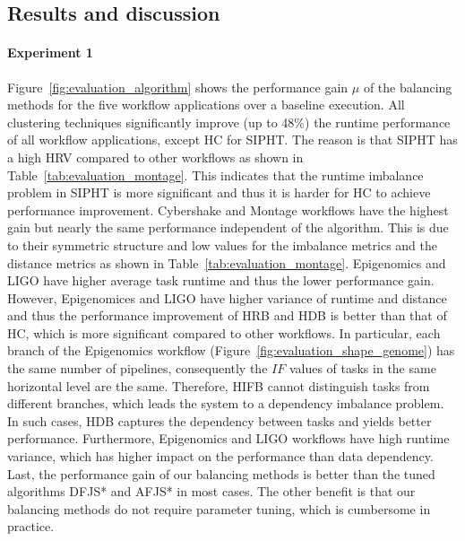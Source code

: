 

\subsection{Results and discussion}
\label{sec:results}
\paragraph{\textbf{Experiment 1}}
Figure~\ref{fig:evaluation_algorithm} shows the performance gain $\mu$ of the balancing methods for the five workflow applications over a baseline execution. All clustering techniques significantly improve (up to 48\%) the runtime performance of all workflow applications, except HC for SIPHT. The reason is that SIPHT has a high HRV compared to other workflows as shown in Table~\ref{tab:evaluation_montage}. This indicates that the runtime imbalance problem in SIPHT is more significant and thus it is harder for HC to achieve performance improvement. Cybershake and Montage workflows have the highest gain but nearly the same performance independent of the algorithm. This is due to their symmetric structure and low values for the imbalance metrics and the distance metrics as shown in Table~\ref{tab:evaluation_montage}. 
Epigenomics and LIGO have higher average task runtime and thus the lower performance gain. However, Epigenomices and LIGO have higher variance of runtime and distance and thus the performance improvement of HRB and HDB is better than that of HC, which is more significant compared to other workflows. 
In particular, each branch of the Epigenomics workflow (Figure~\ref{fig:evaluation_shape_genome}) has the same number of pipelines, consequently the $IF$ values of tasks in the same horizontal level are the same. Therefore, HIFB cannot distinguish tasks from different branches, which leads the system to a dependency imbalance problem. In such cases, HDB captures the dependency between tasks and yields better performance. Furthermore, Epigenomics and LIGO workflows have high runtime variance, which has higher impact on the performance than data dependency. Last, the performance gain of our balancing methods is better than the tuned algorithms DFJS* and AFJS* in most cases. The other benefit is that our balancing methods do not require parameter tuning, which is cumbersome in practice. 

